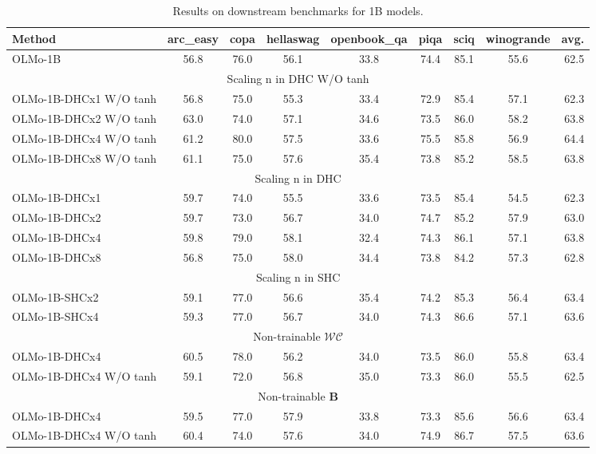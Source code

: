 \begin{table}[h]
\centering
\caption{Results on downstream benchmarks for 1B models.}
\small
\begin{tabular}{lcccccccr}
\toprule
\textbf{Method} & \textbf{arc\_easy} & \textbf{copa} & \textbf{hellaswag} & \textbf{openbook\_qa} & \textbf{piqa} & \textbf{sciq} & \textbf{winogrande} & \textbf{avg.} \\
\midrule
OLMo-1B & 56.8 & 76.0 & 56.1 & 33.8 & 74.4 & 85.1 & 55.6 & 62.5 \\
\midrule  
\multicolumn{9}{c}{ \cellcolor{gray!20} Scaling n in DHC W/O tanh} \\
\midrule
OLMo-1B-DHCx1 W/O tanh & 56.8 & 75.0 & 55.3 & 33.4 & 72.9 & 85.4 & 57.1 & 62.3 \\
OLMo-1B-DHCx2 W/O tanh & 63.0 & 74.0 & 57.1 & 34.6 & 73.5 & 86.0 & 58.2 & 63.8 \\
OLMo-1B-DHCx4 W/O tanh & 61.2 & 80.0 & 57.5 & 33.6 & 75.5 & 85.8 & 56.9 & 64.4 \\
OLMo-1B-DHCx8 W/O tanh & 61.1 & 75.0 & 57.6 & 35.4 & 73.8 & 85.2 & 58.5 & 63.8 \\
\midrule
\multicolumn{9}{c}{\cellcolor{gray!20} Scaling n in DHC} \\
\midrule
OLMo-1B-DHCx1 & 59.7 & 74.0 & 55.5 & 33.6 & 73.5 & 85.4 & 54.5 & 62.3 \\
OLMo-1B-DHCx2 & 59.7 & 73.0 & 56.7 & 34.0 & 74.7 & 85.2 & 57.9 & 63.0 \\
OLMo-1B-DHCx4 & 59.8 & 79.0 & 58.1 & 32.4 & 74.3 & 86.1 & 57.1 & 63.8 \\
OLMo-1B-DHCx8 & 56.8 & 75.0 & 58.0 & 34.4 & 73.8 & 84.2 & 57.3 & 62.8 \\
\midrule
\multicolumn{9}{c}{\cellcolor{gray!20} Scaling n in SHC} \\
\midrule
OLMo-1B-SHCx2 & 59.1 & 77.0 & 56.6 & 35.4 & 74.2 & 85.3 & 56.4 & 63.4 \\
OLMo-1B-SHCx4 & 59.3 & 77.0 & 56.7 & 34.0 & 74.3 & 86.6 & 57.1 & 63.6 \\
\midrule
\multicolumn{9}{c}{\cellcolor{gray!20} Non-trainable $\mathcal{WC}$} \\
\midrule
OLMo-1B-DHCx4 & 60.5 & 78.0 & 56.2 & 34.0 & 73.5 & 86.0 & 55.8 & 63.4 \\
OLMo-1B-DHCx4 W/O tanh & 59.1 & 72.0 & 56.8 & 35.0 & 73.3 & 86.0 & 55.5 & 62.5 \\
\midrule
\multicolumn{9}{c}{\cellcolor{gray!20} Non-trainable $\mathbf{B}$} \\
\midrule
OLMo-1B-DHCx4 & 59.5 & 77.0 & 57.9 & 33.8 & 73.3 & 85.6 & 56.6 & 63.4 \\
OLMo-1B-DHCx4 W/O tanh & 60.4 & 74.0 & 57.6 & 34.0 & 74.9 & 86.7 & 57.5 & 63.6 \\
\bottomrule
\end{tabular}
\label{tab:downstream_benchmarks}
\end{table}




